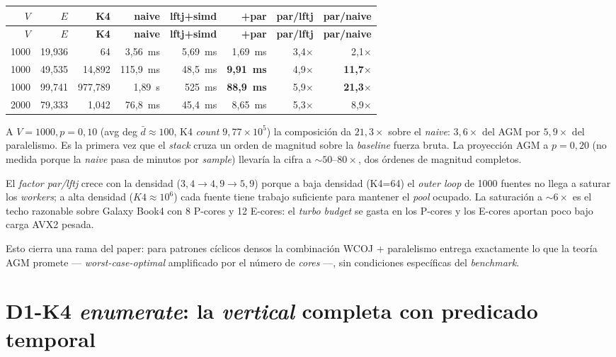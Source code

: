 \documentclass[11pt,a4paper]{report}
\begin{document}
\begin{longtable}{rrrrrrrr}
\toprule
$V$ & $E$ & \textbf{K4} & \textbf{naive} & \textbf{lftj+simd} & \textbf{+par} & \textbf{par/lftj} & \textbf{par/naive} \\
\midrule
\endfirsthead
\toprule
$V$ & $E$ & \textbf{K4} & \textbf{naive} & \textbf{lftj+simd} & \textbf{+par} & \textbf{par/lftj} & \textbf{par/naive} \\
\midrule
\endhead
1000 & 19{,}936 & 64       & 3{,}56~ms  & 5{,}69~ms  & 1{,}69~ms  & 3{,}4$\times$ & 2{,}1$\times$ \\
1000 & 49{,}535 & 14{,}892 & 115{,}9~ms & 48{,}5~ms  & \textbf{9{,}91~ms}  & 4{,}9$\times$ & \textbf{11{,}7}$\times$ \\
1000 & 99{,}741 & 977{,}789 & 1{,}89~s  & 525~ms     & \textbf{88{,}9~ms}  & 5{,}9$\times$ & \textbf{21{,}3}$\times$ \\
2000 & 79{,}333 & 1{,}042  & 76{,}8~ms  & 45{,}4~ms  & 8{,}65~ms  & 5{,}3$\times$ & 8{,}9$\times$ \\
\bottomrule
\end{longtable}

A $V=1000, p=0{,}10$ (avg deg $\bar d \approx 100$, K4 \emph{count} $9{,}77 \times 10^5$) la composición da $21{,}3\times$ sobre el \emph{naive}: $3{,}6\times$ del AGM por $5{,}9\times$ del paralelismo. Es la primera vez que el \emph{stack} cruza un orden de magnitud sobre la \emph{baseline} fuerza bruta. La proyección AGM a $p = 0{,}20$ (no medida porque la \emph{naive} pasa de minutos por \emph{sample}) llevaría la cifra a $\sim 50\text{--}80\times$, dos órdenes de magnitud completos.

El \emph{factor par/lftj} crece con la densidad ($3{,}4 \to 4{,}9 \to 5{,}9$) porque a baja densidad (K4=64) el \emph{outer loop} de 1000 fuentes no llega a saturar los \emph{workers}; a alta densidad ($K4 \approx 10^6$) cada fuente tiene trabajo suficiente para mantener el \emph{pool} ocupado. La saturación a $\sim 6\times$ es el techo razonable sobre Galaxy Book4 con 8 P-cores y 12 E-cores: el \emph{turbo budget} se gasta en los P-cores y los E-cores aportan poco bajo carga AVX2 pesada.

Esto cierra una rama del paper: para patrones cíclicos densos la combinación WCOJ + paralelismo entrega exactamente lo que la teoría AGM promete --- \emph{worst-case-optimal} amplificado por el número de \emph{cores} ---, sin condiciones específicas del \emph{benchmark}.

\section{D1-K4 \emph{enumerate}: la \emph{vertical} completa con predicado temporal}
\end{document}
